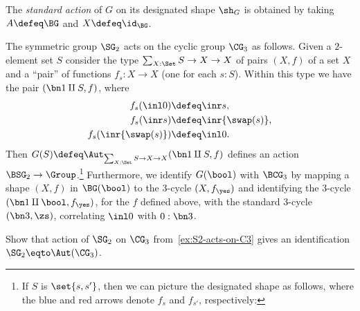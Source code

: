 \begin{definition}\label{std-action}
  The \emph{standard action} of $G$ on its designated shape $\sh_G$ is obtained by
  taking $A \defeq \BG$ and $X \defeq \id_{\BG}$.
\end{definition}

\begin{example}\label{ex:S2-acts-on-C3}
  The symmetric group $\SG_2$ acts on the cyclic group $\CG_3$ as follows.
  Given a $2$-element set $S$ consider the
  type $\sum_{X:\Set}S \to X\to X$ of pairs $(X,f)$ of a set $X$
  and a ``pair'' of functions $f_s:X\to X$ (one for each $s:S$).
  Within this type we have the pair $(\bn 1 \amalg S,f)$,
  where
  \begin{align*}
    f_s(\inl 0)     &\defeq \inr s,\\
    f_s(\inr s)        &\defeq \inr{\swap(s)},\\
    f_s(\inr{\swap(s)}) &\defeq \inl 0.
  \end{align*}
  Then $G(S) \defeq \Aut_{\sum_{X:\Set}S\to X\to X}(\bn1\amalg S,f)$ defines an action
  $\BSG_2 \to \Group$.\footnote{%
    If $S$ is $\set{s,s'}$, then we can picture the
    designated shape as follows,
    where the blue and red arrows denote $f_s$ and $f_{s'}$,
    respectively:\par
    }
  Furthermore, we identify $G(\bool)$ with $\BCG_3$ by mapping
  a shape $(X,f)$ in $\BG(\bool)$ to the $3$-cycle $(X,f_\yes)$
  and identifying the $3$-cycle $(\bn1\amalg\bool,f_\yes)$, for the $f$ defined above,
  with the standard $3$-cycle $(\bn3,\zs)$, correlating $\inl 0$ with $0:\bn 3$.
\end{example}
\begin{xca}\label{xca:AutC3}
  Show that action of $\SG_2$ on $\CG_3$ from~\cref{ex:S2-acts-on-C3}
  gives an identification $\SG_2 \eqto \Aut(\CG_3)$.
\end{xca}

